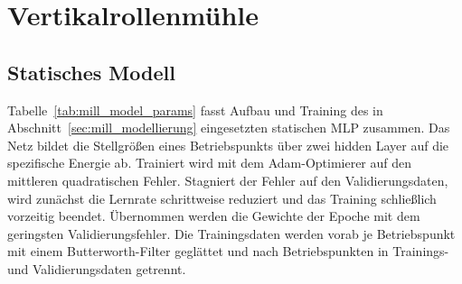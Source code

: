 \section{Vertikalrollenmühle}\label{app:mill_model}
%
\subsection{Statisches Modell}\label{app:mill_model}
%
Tabelle~\ref{tab:mill_model_params} fasst Aufbau und Training des in Abschnitt~\ref{sec:mill_modellierung} eingesetzten statischen \ac{MLP} zusammen. Das Netz bildet die Stellgrößen eines Betriebspunkts über zwei hidden Layer auf die spezifische Energie ab. Trainiert wird mit dem Adam-Optimierer auf den mittleren quadratischen Fehler. Stagniert der Fehler auf den Validierungsdaten, wird zunächst die Lernrate schrittweise reduziert und das Training schließlich vorzeitig beendet. Übernommen werden die Gewichte der Epoche mit dem geringsten Validierungsfehler. Die Trainingsdaten werden vorab je Betriebspunkt mit einem Butterworth-Filter geglättet und nach Betriebspunkten in Trainings- und Validierungsdaten getrennt.
%
